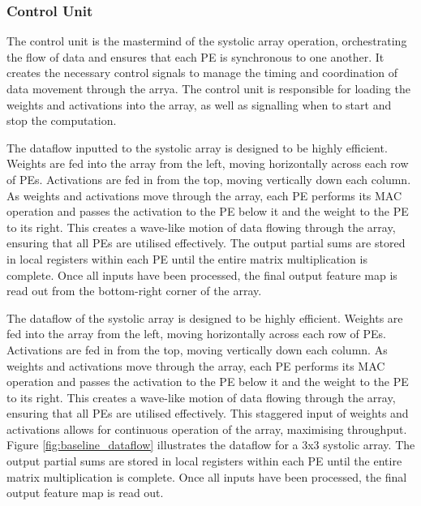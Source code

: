 \documentclass[12pt, a4paper, ukenglish]{article}
\begin{document}
    \subsubsection{Control Unit} \label{sec: baseline cu}
    The control unit is the mastermind of the systolic array operation, orchestrating the flow of data and ensures that each PE is synchronous to one another. It creates the necessary control signals to manage the timing and coordination of data movement through the arrya. The control unit is responsible for loading the weights and activations into the array, as well as signalling when to start and stop the computation. 


    The dataflow inputted to the systolic array is designed to be highly efficient. Weights are fed into the array from the left, moving horizontally across each row of PEs. Activations are fed in from the top, moving vertically down each column. As weights and activations move through the array, each PE performs its MAC operation and passes the activation to the PE below it and the weight to the PE to its right. This creates a wave-like motion of data flowing through the array, ensuring that all PEs are utilised effectively. The output partial sums are stored in local registers within each PE until the entire matrix multiplication is complete. Once all inputs have been processed, the final output feature map is read out from the bottom-right corner of the array.


    The dataflow of the systolic array is designed to be highly efficient. Weights are fed into the array from the left, moving horizontally across each row of PEs. Activations are fed in from the top, moving vertically down each column. As weights and activations move through the array, each PE performs its MAC operation and passes the activation to the PE below it and the weight to the PE to its right. This creates a wave-like motion of data flowing through the array, ensuring that all PEs are utilised effectively. This staggered input of weights and activations allows for continuous operation of the array, maximising throughput. Figure \ref{fig:baseline_dataflow} illustrates the dataflow for a 3x3 systolic array. The output partial sums are stored in local registers within each PE until the entire matrix multiplication is complete. Once all inputs have been processed, the final output feature map is read out.  
\end{document}
